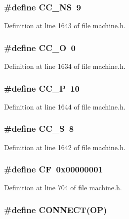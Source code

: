 \subsubsection[{CC\_\-NS}]{\setlength{\rightskip}{0pt plus 5cm}\#define CC\_\-NS~9}\label{machine_8h_7ebf6a7fdc404f528f33d883af9aca9a}




Definition at line 1643 of file machine.h.
\subsubsection[{CC\_\-O}]{\setlength{\rightskip}{0pt plus 5cm}\#define CC\_\-O~0}\label{machine_8h_7a21b8812f3026a091cd3be21e41c606}




Definition at line 1634 of file machine.h.
\subsubsection[{CC\_\-P}]{\setlength{\rightskip}{0pt plus 5cm}\#define CC\_\-P~10}\label{machine_8h_dd55d25ce8fb720437f643c1a17de20d}




Definition at line 1644 of file machine.h.
\subsubsection[{CC\_\-S}]{\setlength{\rightskip}{0pt plus 5cm}\#define CC\_\-S~8}\label{machine_8h_61a632b57063c3be470c2e0bac9ac39b}




Definition at line 1642 of file machine.h.
\subsubsection[{CF}]{\setlength{\rightskip}{0pt plus 5cm}\#define CF~0x00000001}\label{machine_8h_a5676f82f38bd25a2fb2eaa55d2fdce1}




Definition at line 704 of file machine.h.
\subsubsection[{CONNECT}]{\setlength{\rightskip}{0pt plus 5cm}\#define CONNECT(OP)}\label{machine_8h_39a7648865000d8fa2ae64257cb18132}


